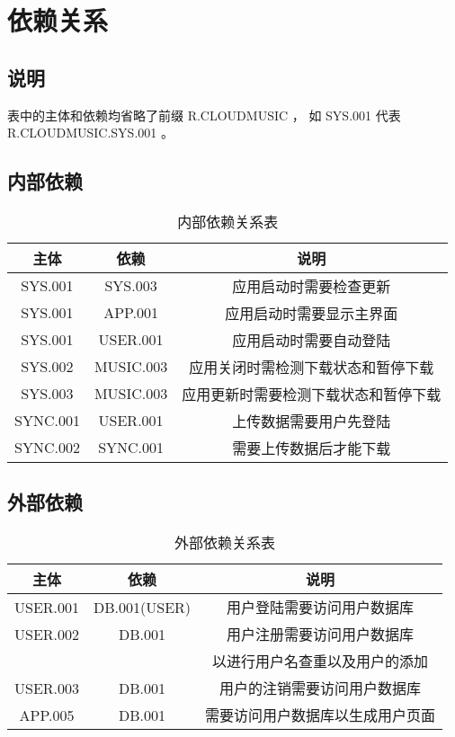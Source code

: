 \chapter{依赖关系}

\section{说明}

    表中的主体和依赖均省略了前缀 R.CLOUDMUSIC ，
    如 SYS.001 代表 R.CLOUDMUSIC.SYS.001 。

\section{内部依赖}
\begin{table}[h]
    \caption {内部依赖关系表}
    \begin{tabular}{|c|c|c|}
        \hline
        主体 & 依赖 & 说明\\
        \hline
        SYS.001 & SYS.003 & 应用启动时需要检查更新\\
        \hline
        SYS.001 & APP.001 & 应用启动时需要显示主界面\\
        \hline
        SYS.001 & USER.001 & 应用启动时需要自动登陆\\
        \hline
        SYS.002 & MUSIC.003 & 应用关闭时需检测下载状态和暂停下载\\
        \hline
        SYS.003 & MUSIC.003 & 应用更新时需要检测下载状态和暂停下载\\
        \hline
        SYNC.001 & USER.001 & 上传数据需要用户先登陆\\
        \hline
        SYNC.002 & SYNC.001 & 需要上传数据后才能下载\\
        \hline
    \end{tabular}
\end{table}

\section{外部依赖}
\begin{table}[h]
    \caption {外部依赖关系表}
    \begin{tabular}{|c|c|c|}
        \hline
        主体 & 依赖 & 说明\\
        \hline
        USER.001 & DB.001(USER) & 用户登陆需要访问用户数据库\\
        \hline
        USER.002 & DB.001 & 用户注册需要访问用户数据库\\
        & & 以进行用户名查重以及用户的添加\\
        \hline
        USER.003 & DB.001 & 用户的注销需要访问用户数据库\\
        \hline
        APP.005 & DB.001 & 需要访问用户数据库以生成用户页面\\
        \hline
    \end{tabular}
\end{table}
